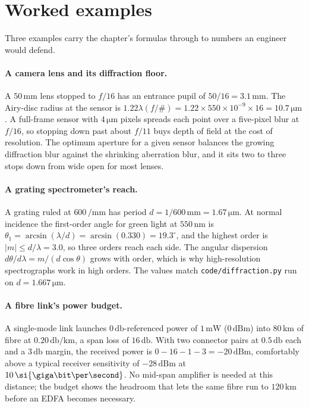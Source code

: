 \section{Worked examples}

Three examples carry the chapter's formulas through to numbers an
engineer would defend.

\paragraph{A camera lens and its diffraction floor.} A
$50\,\si{\milli\meter}$ lens stopped to $f/16$ has an entrance pupil of
$50/16 = 3.1\,\si{\milli\meter}$. The Airy-disc radius at the sensor is
$1.22\lambda(f/\#) = 1.22\times 550\times10^{-9}\times 16 = 10.7\,\si{
\micro\meter}$. A full-frame sensor with $4\,\si{\micro\meter}$ pixels
spreads each point over a five-pixel blur at $f/16$, so stopping down
past about $f/11$ buys depth of field at the cost of resolution. The
optimum aperture for a given sensor balances the growing diffraction
blur against the shrinking aberration blur, and it sits two to three
stops down from wide open for most lenses.

\paragraph{A grating spectrometer's reach.} A grating ruled at
$600\,\si{\per\milli\meter}$ has period $d = 1/600\,\si{\milli\meter} =
1.67\,\si{\micro\meter}$. At normal incidence the first-order angle for
green light at $550\,\si{\nano\meter}$ is
$\theta_{1} = \arcsin(\lambda/d) = \arcsin(0.330) = 19.3^{\circ}$, and
the highest order is $|m| \le d/\lambda = 3.0$, so three orders reach
each side. The angular dispersion $d\theta/d\lambda = m/(d\cos\theta)$
grows with order, which is why high-resolution spectrographs work in
high orders. The values match \texttt{code/diffraction.py} run on
$d = 1.667\,\si{\micro\meter}$.

\paragraph{A fibre link's power budget.} A single-mode link launches
$0\,\si{\decibel}$-referenced power of $1\,\si{\milli\watt}$
($0\,\text{dBm}$) into $80\,\si{\kilo\meter}$ of fibre at
$0.20\,\si{\decibel\per\kilo\meter}$, a span loss of $16\,\si{
\decibel}$. With two connector pairs at $0.5\,\si{\decibel}$ each and a
$3\,\si{\decibel}$ margin, the received power is
$0 - 16 - 1 - 3 = -20\,\text{dBm}$, comfortably above a typical
receiver sensitivity of $-28\,\text{dBm}$ at $10\,\si{\giga\bit\per
\second}$. No mid-span amplifier is needed at this distance; the budget
shows the headroom that lets the same fibre run to $120\,\si{\kilo
\meter}$ before an EDFA becomes necessary.

